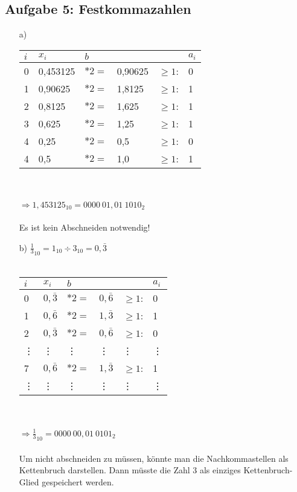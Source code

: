 \documentclass{article}
\begin{document}
	\subsection*{Aufgabe 5: Festkommazahlen}
	\begin{enumerate}
		\item[a)]
		\begin{tabular}[t]{llllll}
			$i$ & $x_i$ & $b$     &       &       & $a_i$ \\
			\hline 
			0   & 0,453125 & $*2 = $ & 0,90625   & $\ge1$: & 0 \\
			1   & 0,90625 & $*2 = $ & 1,8125   & $\ge1$: & 1 \\
			2   & 0,8125  & $*2 = $ & 1,625   & $\ge1$: & 1 \\
			3   & 0,625  & $*2 = $ & 1,25   & $\ge1$: & 1 \\
			4   & 0,25  & $*2 = $ & 0,5   & $\ge1$: & 0 \\
			4   & 0,5  & $*2 = $ & 1,0   & $\ge1$: & 1 \\
		\end{tabular}\\\\
		$\Rightarrow 1,453125_{10} = 0000\:01,01\:1010_2$\\\\
		Es ist kein Abschneiden notwendig! 
		\item[b)] $\frac{1}{3}_{10} = 1_{10} \div 3_{10} = 0,\bar{3}$\\\\
		\begin{tabular}[t]{llllll}
			$i$ & $x_i$ & $b$     &       &       & $a_i$ \\
			\hline 
			0   & $0,\bar{3}$ & $*2 = $ & $0,\bar{6}$   & $\ge1$: & 0 \\
			1   & $0,\bar{6}$ & $*2 = $ & $1,\bar{3}$   & $\ge1$: & 1 \\
			2   & $0,\bar{3}$ & $*2 = $ & $0,\bar{6}$   & $\ge1$: & 0 \\
			\vdots   & \vdots & \vdots & \vdots   & \vdots & \vdots \\
			7  & $0,\bar{6}$ & $*2 = $ & $1,\bar{3}$   & $\ge1$: & 1 \\
			\vdots   & \vdots & \vdots & \vdots   & \vdots & \vdots 
		\end{tabular}\\\\
		$\Rightarrow \frac{1}{3}_{10} = 0000\:00,01\:0101_2$\\\\
		Um nicht abschneiden zu müssen, könnte man die Nachkommastellen als Kettenbruch darstellen. Dann müsste die Zahl 3 als einziges Kettenbruch-Glied gespeichert werden. 
	\end{enumerate}
\end{document}
